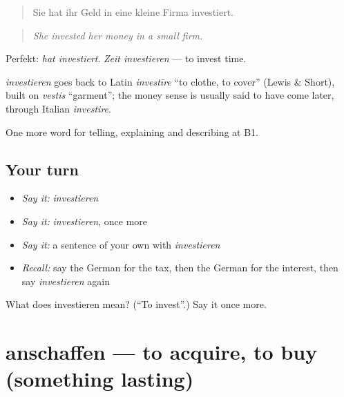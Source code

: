 \begin{quote}
Sie hat ihr Geld in eine kleine Firma investiert.
\end{quote}

\begin{quote}
\emph{She invested her money in a small firm.}
\end{quote}

Perfekt: \emph{hat investiert}. \emph{Zeit investieren} — to invest time.

\begin{cousinweb}
\emph{investieren} goes back to Latin \emph{investīre} \textquotedblleft{}to clothe, to cover\textquotedblright{} (Lewis \& Short), built on \emph{vestis} \textquotedblleft{}garment\textquotedblright{}; the money sense is usually said to have come later, through Italian \emph{investire}.
\end{cousinweb}

\begin{grammarlens}[title={What you've built}]
One more word for telling, explaining and describing at B1.
\end{grammarlens}

\subsection*{Your turn}
\begin{itemize}
\raggedright
  \item \emph{Say it:} \emph{investieren}
  \item \emph{Say it:} \emph{investieren}, once more
  \item \emph{Say it:} a sentence of your own with \emph{investieren}
  \item \emph{Recall:} say the German for the tax, then the German for the interest, then say \emph{investieren} again
\end{itemize}

\begin{tcolorbox}[breakable,colback=teal!4,colframe=teal!35!black,title={Before you move on}]
What does investieren mean? (\textquotedblleft{}To invest\textquotedblright{}.) Say it once more.
\end{tcolorbox}
\section[anschaffen]{anschaffen — to acquire, to buy (something lasting)}

\label{lesson:GE-C391-anschaffen}



